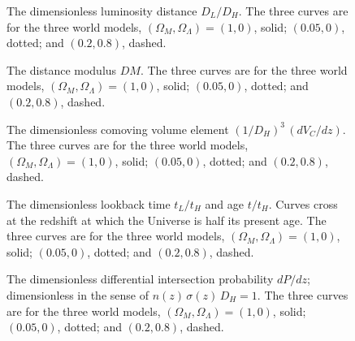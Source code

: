 \begin{figure}
\caption[The dimensionless luminosity distance $D_L/D_H$.]{
The dimensionless luminosity distance $D_L/D_H$.  The three curves are
for the three world models, $(\Omega_M,\Omega_{\Lambda})=(1,0)$,
solid; $(0.05,0)$, dotted; and $(0.2,0.8)$, dashed.}
\label{lumdis}
\end{figure}

\begin{figure}
\caption[The distance modulus $DM$.]{
The distance modulus $DM$.  The three curves are for the three world
models, $(\Omega_M,\Omega_{\Lambda})=(1,0)$, solid; $(0.05,0)$,
dotted; and $(0.2,0.8)$, dashed.}
\label{distmod}
\end{figure}

\begin{figure}
\caption[The dimensionless comoving volume element $(1/D_H)^3\,(dV_C/dz)$.]{
The dimensionless comoving volume element $(1/D_H)^3\,(dV_C/dz)$.  The
three curves are for the three world models,
$(\Omega_M,\Omega_{\Lambda})=(1,0)$, solid; $(0.05,0)$, dotted; and
$(0.2,0.8)$, dashed.}
\label{dcomvoldz}
\end{figure}

\begin{figure}
\caption[The dimensionless lookback time $t_L/t_H$ and age $t/t_H$.]{
The dimensionless lookback time $t_L/t_H$ and age $t/t_H$.  Curves
cross at the redshift at which the Universe is half its present age.
The three curves are for the three world models,
$(\Omega_M,\Omega_{\Lambda})=(1,0)$, solid; $(0.05,0)$, dotted; and
$(0.2,0.8)$, dashed.}
\label{lookback}
\end{figure}

\begin{figure}
\caption[The dimensionless differential intersection probability $dP/dz$.]{
The dimensionless differential intersection probability $dP/dz$;
dimensionless in the sense of $n(z)\,\sigma(z)\,D_H=1$.  The three
curves are for the three world models,
$(\Omega_M,\Omega_{\Lambda})=(1,0)$, solid; $(0.05,0)$, dotted; and
$(0.2,0.8)$, dashed.}
\label{doptdepthdz}
\end{figure}


